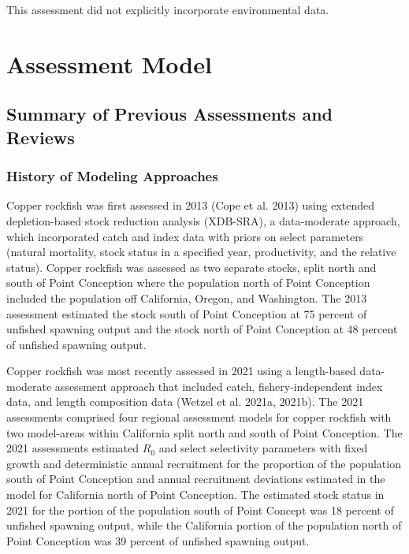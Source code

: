 \documentclass[11pt,
  english,
  letterpaper,
]{article}
\begin{document}
This assessment did not explicitly incorporate environmental data.

\hypertarget{assessment-model}{%
\section{Assessment Model}\label{assessment-model}}

\hypertarget{summary-of-previous-assessments-and-reviews}{%
\subsection{Summary of Previous Assessments and Reviews}\label{summary-of-previous-assessments-and-reviews}}

\hypertarget{history-of-modeling-approaches}{%
\subsubsection{History of Modeling Approaches}\label{history-of-modeling-approaches}}

Copper rockfish was first assessed in 2013 (Cope et al. 2013) using extended depletion-based stock reduction analysis (XDB-SRA), a data-moderate approach, which incorporated catch and index data with priors on select parameters (natural mortality, stock status in a specified year, productivity, and the relative status). Copper rockfish was assessed as two separate stocks, split north and south of Point Conception where the population north of Point Conception included the population off California, Oregon, and Washington. The 2013 assessment estimated the stock south of Point Conception at 75 percent of unfished spawning output and the stock north of Point Conception at 48 percent of unfished spawning output.

Copper rockfish was most recently assessed in 2021 using a length-based data-moderate assessment approach that included catch, fishery-independent index data, and length composition data (Wetzel et al. 2021a, 2021b). The 2021 assessments comprised four regional assessment models for copper rockfish with two model-areas within California split north and south of Point Conception. The 2021 assessments estimated \(R_0\) and select selectivity parameters with fixed growth and deterministic annual recruitment for the proportion of the population south of Point Conception and annual recruitment deviations estimated in the model for California north of Point Conception. The estimated stock status in 2021 for the portion of the population south of Point Concept was 18 percent of unfished spawning output, while the California portion of the population north of Point Conception was 39 percent of unfished spawning output.
\end{document}
